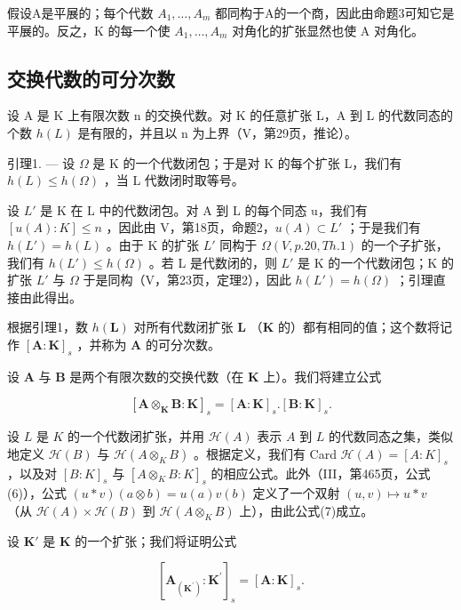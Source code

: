 假设A是平展的；每个代数 \(A_{1}, \ldots, A_{m}\) 都同构于A的一个商，因此由命题3可知它是平展的。反之，K 的每一个使 \(A_{1}, \ldots, A_{m}\) 对角化的扩张显然也使 A 对角化。

\subsection{交换代数的可分次数}

设 A 是 K 上有限次数 n 的交换代数。对 K 的任意扩张 L，A 到 L 的代数同态的个数 \(h(L)\) 是有限的，并且以 n 为上界（V，第29页，推论）。

引理1. --- 设 \(\Omega\) 是 K 的一个代数闭包；于是对 K 的每个扩张 L，我们有 \(h(L) \leqslant h(\Omega)\) ，当 L 代数闭时取等号。

设 \(L'\) 是 K 在 L 中的代数闭包。对 A 到 L 的每个同态 u，我们有 \([u(A):K] \leqslant n\) ，因此由 V，第18页，命题2，\(u(A) \subset L'\) ；于是我们有 \(h(L') = h(L)\) 。由于 K 的扩张 \(L'\) 同构于 \(\Omega(V, p. 20, Th. 1)\) 的一个子扩张，我们有 \(h(L') \leqslant h(\Omega)\) 。若 L 是代数闭的，则 \(L'\) 是 K 的一个代数闭包；K 的扩张 \(L'\) 与 \(\Omega\) 于是同构（V，第23页，定理2），因此 \(h(L') = h(\Omega)\) ；引理直接由此得出。

根据引理1，数 \(h(\mathbf{L})\) 对所有代数闭扩张 \(\mathbf{L}\) （\(\mathbf{K}\) 的）都有相同的值；这个数将记作 \([\mathbf{A}:\mathbf{K}]_s\) ，并称为 \(\mathbf{A}\) 的可分次数。

设 \(\mathbf{A}\) 与 \(\mathbf{B}\) 是两个有限次数的交换代数（在 \(\mathbf{K}\) 上）。我们将建立公式

\[
[ \mathbf {A} \otimes_ {\mathbf {K}} \mathbf {B}: \mathbf {K} ] _ {s} = [ \mathbf {A}: \mathbf {K} ] _ {s}. [ \mathbf {B}: \mathbf {K} ] _ {s}.\tag{7}
\]

设 \(L\) 是 \(K\) 的一个代数闭扩张，并用 \(\mathcal{H}(A)\) 表示 \(A\) 到 \(L\) 的代数同态之集，类似地定义 \(\mathcal{H}(B)\) 与 \(\mathcal{H}(A \otimes_K B)\) 。根据定义，我们有 Card \(\mathcal{H}(A) = [A : K]_s\) ，以及对 \([B:K]_{s}\) 与 \([A\otimes_{K}B:K]_{s}\) 的相应公式。此外（III，第465页，公式(6)），公式 \((u*v)(a\otimes b)=u(a)v(b)\) 定义了一个双射 \((u,v)\mapsto u*v\) （从 \(\mathcal{H}(A)\times\mathcal{H}(B)\) 到 \(\mathcal{H}(A\otimes_{K}B)\) 上），由此公式(7)成立。

设 \(\mathbf{K}'\) 是 \(\mathbf{K}\) 的一个扩张；我们将证明公式

\[
[ \mathbf {A} _ {(\mathbf {K} ^ {\prime})}: \mathbf {K} ^ {\prime} ] _ {s} = [ \mathbf {A}: \mathbf {K} ] _ {s}.\tag{8}
\]

